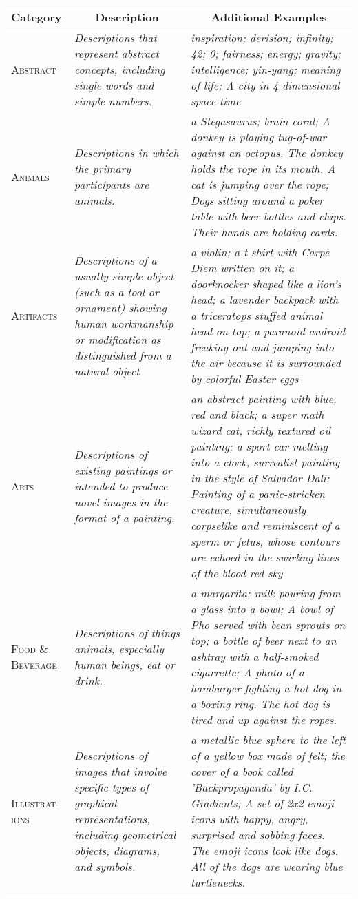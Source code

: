 \begin{table*}
\centering
\renewcommand{\arraystretch}{1.5}
\begin{adjustbox}{center}
\begin{tabular}{p{1.5cm}p{5cm}p{10cm}}
\toprule
Category & \multicolumn{1}{c}{Description} & \multicolumn{1}{c}{Additional Examples} \\
\midrule
\textsc{Abstract} & \textit{Descriptions that represent abstract concepts, including single words and simple numbers.} & \textit{inspiration; derision; infinity; 42; 0; fairness; energy; gravity; intelligence; yin-yang; meaning of life; A city in 4-dimensional space-time} \\
\textsc{Animals} & \textit{Descriptions in which the primary participants are animals.} & \textit{a Stegasaurus; brain coral; A donkey is playing tug-of-war against an octopus. The donkey holds the rope in its mouth. A cat is jumping over the rope; Dogs sitting around a poker table with beer bottles and chips. Their hands are holding cards.} \\
\textsc{Artifacts} & \textit{Descriptions of a usually simple object (such as a tool or ornament) showing human workmanship or modification as distinguished from a natural object} & \textit{a violin; a t-shirt with Carpe Diem written on it; a doorknocker shaped like a lion's head; a lavender backpack with a triceratops stuffed animal head on top; a paranoid android freaking out and jumping into the air because it is surrounded by colorful Easter eggs} \\
\textsc{Arts} & \textit{Descriptions of existing paintings or intended to produce novel images in the format of a painting.} & \textit{an abstract painting with blue, red and black; a super math wizard cat, richly textured oil painting; a sport car melting into a clock, surrealist painting in the style of Salvador Dali; Painting of a panic-stricken creature, simultaneously corpselike and reminiscent of a sperm or fetus, whose contours are echoed in the swirling lines of the blood-red sky} \\
\textsc{Food \& Beverage} & \textit{Descriptions of things animals, especially human beings, eat or drink.} & \textit{a margarita; milk pouring from a glass into a bowl; A bowl of Pho served with bean sprouts on top; a bottle of beer next to an ashtray with a half-smoked cigarrette; A photo of a hamburger fighting a hot dog in a boxing ring. The hot dog is tired and up against the ropes.} \\
\textsc{Illustrat- ions} & \textit{Descriptions of images that involve specific types of graphical representations, including geometrical objects, diagrams, and symbols.} & \textit{a metallic blue sphere to the left of a yellow box made of felt; the cover of a book called 'Backpropaganda' by I.C. Gradients; A set of 2x2 emoji icons with happy, angry, surprised and sobbing faces. The emoji icons look like dogs. All of the dogs are wearing blue turtlenecks.} \\

\end{tabular}
\end{adjustbox}
\end{table*}
